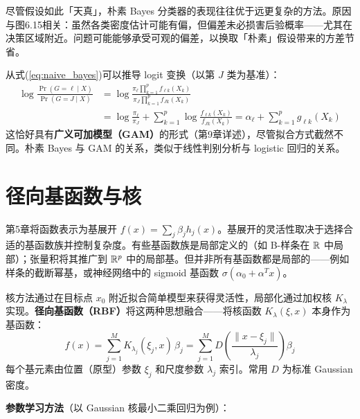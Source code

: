 尽管假设如此「天真」，朴素 Bayes 分类器的表现往往优于远更复杂的方法。原因与图6.15相关：虽然各类密度估计可能有偏，但偏差未必损害后验概率——尤其在决策区域附近。问题可能能够承受可观的偏差，以换取「朴素」假设带来的方差节省。

从式(\ref{eq:naive_bayes})可以推导 logit 变换（以第 $J$ 类为基准）：
\begin{align}
    \log \frac{\Pr(G = \ell \mid X)}{\Pr(G = J \mid X)}
    &= \log \frac{\pi_\ell \prod_{k=1}^{p} f_{\ell k}(X_k)}{\pi_J \prod_{k=1}^{p} f_{J k}(X_k)} \nonumber \\
    &= \log \frac{\pi_\ell}{\pi_J} + \sum_{k=1}^{p} \log \frac{f_{\ell k}(X_k)}{f_{J k}(X_k)}
    = \alpha_\ell + \sum_{k=1}^{p} g_{\ell k}(X_k) \label{eq:naive_bayes_logit}
\end{align}
这恰好具有\textbf{广义可加模型（GAM）}的形式（第9章详述），尽管拟合方式截然不同。朴素 Bayes 与 GAM 的关系，类似于线性判别分析与 logistic 回归的关系。

\section{径向基函数与核}

第5章将函数表示为基展开 $f(x) = \sum_j \beta_j h_j(x)$。基展开的灵活性取决于选择合适的基函数族并控制复杂度。有些基函数族是局部定义的（如 B-样条在 $\mathbb{R}$ 中局部）；张量积将其推广到 $\mathbb{R}^p$ 中的局部基。但并非所有基函数都是局部的——例如样条的截断幂基，或神经网络中的 sigmoid 基函数 $\sigma(\alpha_0 + \alpha^T x)$。

核方法通过在目标点 $x_0$ 附近拟合简单模型来获得灵活性，局部化通过加权核 $K_\lambda$ 实现。\textbf{径向基函数（RBF）}将这两种思想融合——将核函数 $K_\lambda(\xi, x)$ 本身作为基函数：
\begin{equation}\label{eq:rbf}
    f(x) = \sum_{j=1}^{M} K_{\lambda_j}(\xi_j, x) \, \beta_j
    = \sum_{j=1}^{M} D\!\left(\frac{\|x - \xi_j\|}{\lambda_j}\right) \beta_j
\end{equation}
每个基元素由位置（原型）参数 $\xi_j$ 和尺度参数 $\lambda_j$ 索引。常用 $D$ 为标准 Gaussian 密度。

\textbf{参数学习方法}（以 Gaussian 核最小二乘回归为例）：

